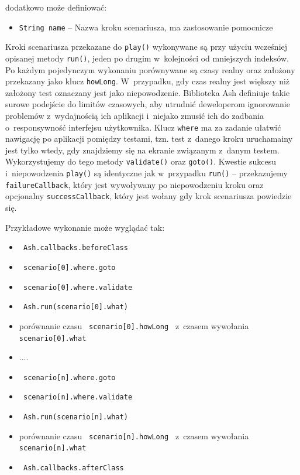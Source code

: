 \documentclass[brudnopis]{xmgr}
\begin{document}
dodatkowo może definiować:

\begin{itemize} 
  \item \texttt{String name} -- Nazwa kroku scenariusza, ma zastosowanie pomocnicze
\end{itemize}

Kroki scenariusza przekazane do \texttt{play()} wykonywane są przy użyciu wcześniej opisanej metody \texttt{run()}, jeden po drugim w~kolejności od mniejszych indeksów. Po każdym pojedynczym wykonaniu porównywane są czasy realny oraz założony przekazany jako klucz \texttt{howLong}. W~przypadku, gdy czas realny jest większy niż założony test oznaczany jest jako niepowodzenie. Biblioteka Ash definiuje takie surowe podejście do limitów czasowych, aby utrudnić deweloperom ignorowanie problemów z~wydajnością ich aplikacji i~niejako zmusić ich do zadbania o~responsywność interfejsu użytkownika. Klucz \texttt{where} ma za zadanie ułatwić nawigację po aplikacji pomiędzy testami, tzn. test z~danego kroku uruchamainy jest tylko wtedy, gdy znajdziemy się na ekranie związanym z~danym testem. Wykorzystujemy do tego metody \texttt{validate()} oraz \texttt{goto()}. Kwestie sukcesu i~niepowodzenia \texttt{play()} są identyczne jak w~przypadku \texttt{run()} -- przekazujemy \texttt{failureCallback}, który jest wywoływany po niepowodzeniu kroku oraz opcjonalny \texttt{successCallback},  który jest wołany gdy krok scenariusza powiedzie się. 

Przykładowe wykonanie może wyglądać tak:

\begin{itemize}
  \item \texttt{ Ash.callbacks.beforeClass }
  \item \texttt{ scenario[0].where.goto }
  \item \texttt{ scenario[0].where.validate }
  \item \texttt{ Ash.run(scenario[0].what) }
  \item porównanie czasu \texttt{ scenario[0].howLong } z~czasem wywołania \texttt{ scenario[0].what }
  \item ....
  \item \texttt{ scenario[n].where.goto }
  \item \texttt{ scenario[n].where.validate }
  \item \texttt{ Ash.run(scenario[n].what) }
  \item porównanie czasu \texttt{ scenario[n].howLong } z~czasem wywołania \texttt{ scenario[n].what }
  \item \texttt{ Ash.callbacks.afterClass }
\end{itemize}
\end{document}
